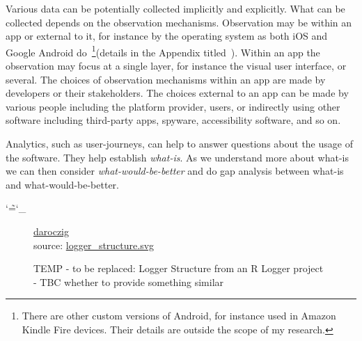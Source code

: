 Various data can be potentially collected implicitly and explicitly. What can be collected depends on the observation mechanisms. Observation may be within an app or external to it, for instance by the operating system as both iOS  and Google Android do~\footnote{There are other custom versions of Android, for instance used in Amazon Kindle Fire devices. Their details are outside the scope of my research.}(details in the Appendix titled~\href{chapter-on-mobile-analytics}{\emph{}}). Within an app the observation may focus at a single layer, for instance the visual user interface, or several. The choices of observation mechanisms within an app are made by developers or their stakeholders. The choices external to an app can be made by various people including the platform provider, users, or indirectly using other software including third-party apps, spyware, accessibility software, and so on.

Analytics, such as user-journeys, can help to answer questions about the usage of the software. They help establish \emph{what-is}. As we understand more about what-is we can then consider \emph{what-would-be-better} and do gap analysis between what-is and what-would-be-better.

\makeatletter
\DeclareRobustCommand*{\escapeus}[1]{%
    \begingroup\@activeus\scantokens{#1\endinput}\endgroup}
\begingroup\lccode`\~=`\_\relax
    \lowercase{\endgroup\def\@activeus{\catcode`\_=\active \let~\_}}
\makeatother

\begin{figure}
\centering
    \copyrightbox[r]{
        \escapeus{}}
    {\textcopyright \href{{https://twitter.com/daroczig}}{daroczig}\\source: \href{https://github.com/daroczig/logger/blob/master/vignettes/logger\_structure.svg}{logger\_structure.svg}}
    \caption{TEMP - to be replaced: Logger Structure from an R Logger project - TBC whether to provide something similar}
    \label{fig:temp_logger_structure}
\end{figure}

